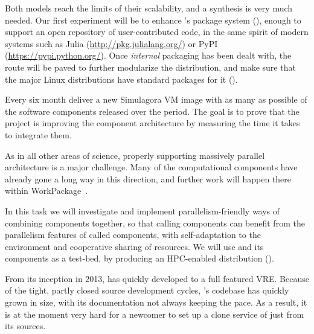 \begin{workpackage}[id=component-architecture,wphases=0-48!.5,
  title=Component Architecture,lead=UV,
  PSRM=64,UVRM=8,SARM=16, USHRM=4, USORM=6, UORM=4, LLRM=22]
\begin{tasklist}
\begin{task}[title=Modularization and packaging,id=mod-packaging,lead=UV,PM=32,partners={PS,LL},wphases=0-48]
    Both models reach the limits of their scalability, and a synthesis
    is very much needed.  Our first experiment will be to enhance
    \Sage's package system
    (), enough to
    support an open repository of user-contributed code, in the same
    spirit of modern systems such as Julia
    (\url{http://pkg.julialang.org/}) or PyPI
    (\url{https://pypi.python.org/}).  Once \emph{internal} packaging
    has been dealt with, the route will be paved to further modularize
    the \Sage distribution, and make sure that the major Linux
    distributions have standard packages for it
    ().

  \end{task}

\begin{task}[id=simulagora-dev,title=Simulagora integration,PM=4,lead=LL,wphases=0-48]
  Every six month deliver a new Simulagora VM image with as many as possible of the software
  components released over the period. The goal is to prove that the project is
  improving the component architecture by measuring the time it takes to
  integrate them.
\end{task}


  \begin{task}[title=Component architecture for High Performance Computing and Parallelism,id=component-for-HPC,PM=12,wphases=36-48]
    As in all other areas of science, properly supporting massively
    parallel architecture is a major challenge. Many of the
    computational components have already gone a long way in this
    direction, and further work will happen there within
    WorkPackage~.

    In this task we will investigate and implement
    parallelism-friendly ways of combining components together, so
    that calling components can benefit from the parallelism features
    of called components, with self-adaptation to the environment and
    cooperative sharing of resources. We will use \Sage and its
    components as a test-bed, by producing an HPC-enabled distribution
    ().
  \end{task}

  \begin{task}[title=Document and modularize \SMC's codebase,id=extract-smc,lead=PS,PM=10,partners={UV},wphases=0-24]
    From its inception in 2013, \SMC has quickly developed to a full
    featured VRE.  Because of the tight, partly closed source
    development cycles, \SMC's codebase has quickly grown in size,
    with its documentation not always keeping the pace. As a result,
    it is at the moment very hard for a newcomer to set up a clone
    service of \SMC just from its sources.


\end{task}
\end{tasklist}
\end{workpackage}

